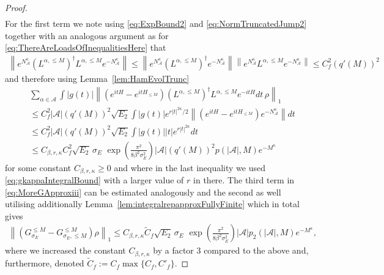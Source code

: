 \documentclass[11pt]{amsart}
\newcommand{\1}{\mathbbm{1}}
\newcommand{\NA}{N_{\mathcal{A}}}
\newcommand{\cA}{\mathcal{A}}
\theoremstyle{plain}
\theoremstyle{definition}
\theoremstyle{remark}
\numberwithin{equation}{section}
\begin{document}
\begin{proof}
\begin{align}
\end{align}
For the first term we note using \eqref{eq:ExpBound2} and \eqref{eq:NormTruncatedJump2} 
 together with an analogous argument as for \eqref{eq:ThereAreLoadsOfInequalitiesHere} that 
\begin{align*}
    \left\|e^{\NA^{\kappa}}(L^{\alpha,\le M})^\dagger L^{\alpha,\le M}e^{-\NA^{\kappa}}\right\| \le  \left\|e^{\NA^{\kappa}}(L^{\alpha,\le M})^\dagger e^{-\NA^{\kappa}}\right\|\left\|e^{\NA^{\kappa}} L^{\alpha,\le M}e^{-\NA^{\kappa}}\right\| \le C^2_f (q'(M))^2 
\end{align*}
and therefore using Lemma~\ref{lem:HamEvolTrunc}
\begin{align*}
&\sum_{\alpha\in\cA }\int |g(t)| \left\|\left(e^{itH}-e^{itH_{\le M}}\right) (L^{\alpha,\le M})^\dagger L^{\alpha,\le M} e^{-itH}dt\,\rho \right\|_1\\&\le C^2_f|\cA|(q'(M))^2\sqrt{E_2} \int |g(t)| e^{r|t|^{2\kappa}/2} \left\|\left(e^{itH}-e^{itH_{\le M}}\right)e^{-\NA^{\kappa}}\right\| dt\\&\le C^2_f|\cA|(q'(M))^2\sqrt{E_2} \int |g(t)| |t|e^{r|t|^{2\kappa}}dt\\& \le C_{\beta,r,\kappa}C^2_f\sqrt{E_2} \,
\sigma_E\,\,
\exp\!\left(\frac{\pi^2}{8\beta^2\sigma_E^2}\right) |\cA|(q'(M))^2p(|\cA|,M)e^{-M^{\kappa}}
\end{align*}
for some constant $C_{\beta,r,\kappa}\ge0$ and
where in the last inequality we used \eqref{eq:gkappaIntegralBound} with a larger value of $r$ in there. The third term in \eqref{eq:MoreGApproxiii} can be estimated analogously and the second as well utilising additionally Lemma~\ref{lem:integralrepapproxFullyFinite} which in total gives
\begin{align*}
    \left\|\left(G^{\le M}_{\sigma_E}-G^{\le M}_{\sigma_E,\le M}\right)\rho\right\|_1\le C_{\beta,r,\kappa}\widetilde C_f\sqrt{E_2} \,
\sigma_E\,\,
\exp\!\left(\frac{\pi^2}{8\beta^2\sigma_E^2}\right) |\cA|p_2(|\cA|,M)e^{-M^{\kappa}},
\end{align*}
where we increased the constant $C_{\beta,r,\kappa}$ by a factor 3 compared to the above and, furthermore, denoted $\widetilde C_f := C_f\max\{C_f,C'_f\}.$


\end{proof}
\end{document}
